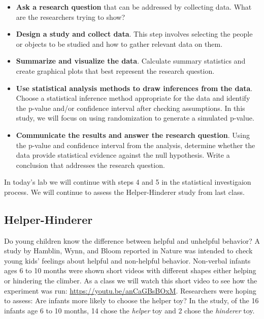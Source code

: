 \documentclass[
]{report}
\begin{document}
\begin{itemize}
\item
  \textbf{Ask a research question} that can be addressed by collecting data. What are the researchers trying to show?
\item
  \textbf{Design a study and collect data}. This step involves selecting the people or objects to be studied and how to gather relevant data on them.
\item
  \textbf{Summarize and visualize the data}. Calculate summary statistics and create graphical plots that best represent the research question.
\item
  \textbf{Use statistical analysis methods to draw inferences from the data}. Choose a statistical inference method appropriate for the data and identify the p-value and/or confidence interval after checking assumptions. In this study, we will focus on using randomization to generate a simulated p-value.
\item
  \textbf{Communicate the results and answer the research question}. Using the p-value and confidence interval from the analysis, determine whether the data provide statistical evidence against the null hypothesis. Write a conclusion that addresses the research question.
\end{itemize}

\newpage

In today's lab we will continue with steps 4 and 5 in the statistical investigaion process. We will continue to assess the Helper-Hinderer study from last class.

\hypertarget{helper-hinderer-1}{%
\subsection{Helper-Hinderer}\label{helper-hinderer-1}}

Do young children know the difference between helpful and unhelpful behavior? A study by Hamblin, Wynn, and Bloom reported in Nature was intended to check young kids' feelings about helpful and non-helpful behavior. Non-verbal infants ages 6 to 10 months were shown short videos with different shapes either helping or hindering the climber. As a class we will watch this short video to see how the experiment was run: \url{https://youtu.be/anCaGBsBOxM}. Researchers were hoping to assess: Are infants more likely to choose the helper toy? In the study, of the 16 infants age 6 to 10 months, 14 chose the \emph{helper} toy and 2 chose the \emph{hinderer} toy.
\end{document}
